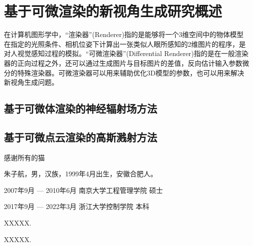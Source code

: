 \documentclass[master,oneside,winfonts]{njuthesis/njuthesis}
\begin{document}
\section{基于可微渲染的新视角生成研究概述}
在计算机图形学中，“渲染器”(Renderer)指的是能够将一个3维空间中的物体模型在指定的光照条件、相机位姿下计算出一张类似人眼所感知的2维图片的程序，是对人视觉感知过程的模拟。“可微渲染器”(Differential Renderer)指的是在一般渲染器的正向过程之外，还可以通过生成图片与目标图片的差值，反向估计输入参数微分的特殊渲染器。可微渲染器可以用来辅助优化3D模型的参数，也可以用来解决新视角生成问题。

\subsection{基于可微体渲染的神经辐射场方法}


\subsection{基于可微点云渲染的高斯溅射方法}


\backmatter 

\begin{acknowledgement}
    感谢所有的猫
\end{acknowledgement}

\begin{spacing}{0.2}
    
\end{spacing}

\begin{resume}
    \begin{authorinfo}
        \noindent 朱子航，男，汉族，1999年4月出生，安徽合肥人。
    \end{authorinfo}
    \begin{education}
    \item[2007年9月 --- 2010年6月] 南京大学工程管理学院 \hfill 硕士
    \item[2017年9月 --- 2022年3月] 浙江大学控制学院 \hfill 本科
    \end{education}
    \begin{publications}
        \item XXXXX.
        \item XXXXX.
    \end{publications}
\end{resume}
\end{document}
